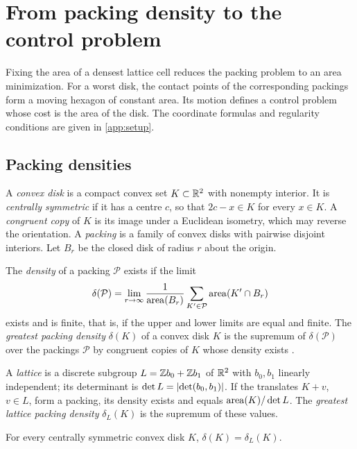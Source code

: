 \section{From packing density to the control problem}\label{sec:setting}

Fixing the area of a densest lattice cell reduces the packing problem to an area minimization. For
a worst disk, the contact points of the corresponding packings form a moving hexagon of constant
area. Its motion defines a control problem whose cost is the area of the disk. The coordinate
formulas and regularity conditions are given in \cref{app:setup}.

\subsection{Packing densities}\label{sec:set-packings}

A \emph{convex disk} is a compact convex set $K\subset\mathbb{R}^2$ with nonempty interior. It is
\emph{centrally symmetric} if it has a centre $c$, so that $2c-x\in K$ for every $x\in K$. A
\emph{congruent copy} of $K$ is its image under a Euclidean isometry, which may reverse the
orientation. A \emph{packing} is a family of convex disks with pairwise disjoint interiors. Let
$B_r$ be the closed disk of radius $r$ about the origin.

\begin{definition}\label{def:packing-density}
The \emph{density} of a packing $\mathcal P$ exists if the limit
\[
  \delta(\mathcal P)=\lim_{r\to\infty}\frac{1}{\operatorname{area}(B_r)}\sum_{K'\in\mathcal P}\operatorname{area}(K'\cap B_r)
\]
exists and is finite, that is, if the upper and lower limits are equal and finite. The
\emph{greatest packing density} $\delta(K)$ of a convex disk $K$ is the supremum of
$\delta(\mathcal P)$ over the packings $\mathcal P$ by congruent copies of $K$ whose density
exists \cite[Def.~2.1.1]{HalesVajjha2024}.
\end{definition}

A \emph{lattice} is a discrete subgroup $L=\mathbb{Z} b_0+\mathbb{Z} b_1$ of $\mathbb{R}^2$ with $b_0,b_1$ linearly
independent; its determinant is $\det L=\lvert \det(b_0,b_1)\rvert$. If the translates $K+v$, $v\in L$,
form a packing, its density exists and equals $\operatorname{area}(K)/\det L$. The \emph{greatest lattice packing
density} $\delta_L(K)$ is the supremum of these values.

\begin{theorem}\label{thm:fejes-toth}
For every centrally symmetric convex disk $K$, $\delta(K)=\delta_L(K)$.
\end{theorem}

